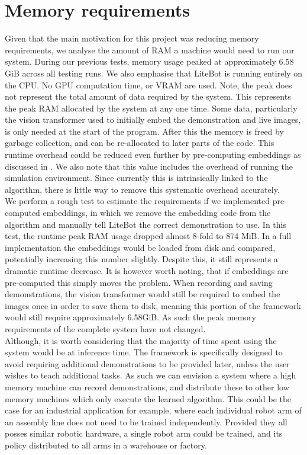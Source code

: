\section{Memory requirements}
\label{sec:memory}
Given that the main motivation for this project was reducing memory requirements, we analyse the amount of RAM a machine would need to run our system. During our previous tests, memory usage peaked at approximately 6.58 GiB across all testing runs. We also emphasise that LiteBot is running entirely on the CPU. No GPU computation time, or VRAM are used. Note, the peak does not represent the total amount of data required by the system. This represents the peak RAM allocated by the system at any one time. Some data, particularly the vision transformer used to initially embed the demonstration and live images, is only needed at the start of the program. After this the memory is freed by garbage collection, and can be re-allocated to later parts of the code. This runtime overhead could be reduced even further by pre-computing embeddings as discussed in . We also note that this value includes the overhead of running the simulation environment. Since currently this is intrinsically linked to the algorithm, there is little way to remove this systematic overhead accurately.\\

We perform a rough test to estimate the requirements if we implemented pre-computed embeddings, in which we remove the embedding code from the algorithm and manually tell LiteBot the correct demonstration to use. In this test, the runtime peak RAM usage dropped almost 8-fold to 874 MiB. In a full implementation the embeddings would be loaded from disk and compared, potentially increasing this number slightly. Despite this, it still represents a dramatic runtime decrease. It is however worth noting, that if embeddings are pre-computed this simply moves the problem. When recording and saving demonstrations, the vision transformer would still be required to embed the images once in order to save them to disk, meaning this portion of the framework would still require approximately 6.58GiB. As such the peak memory requirements of the complete system have not changed.\\

Although, it is worth considering that the majority of time spent using the system would be at inference time. The framework is specifically designed to avoid requiring additional demonstrations to be provided later, unless the user wishes to teach additional tasks. As such we can envision a system where a high memory machine can record demonstrations, and distribute these to other low memory machines which only execute the learned algorithm. This could be the case for an industrial application for example, where each individual robot arm of an assembly line does not need to be trained independently. Provided they all posses similar robotic hardware, a single robot arm could be trained, and its policy distributed to all arms in a warehouse or factory.\\

